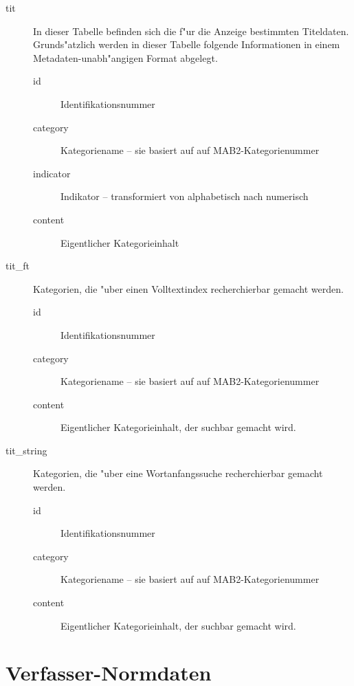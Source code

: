 \documentclass[11pt, twoside, a4paper, BCOR8mm, DIV12, bibtotoc,idxtotoc]{scrbook}
\begin{document}
\begin{description}
\item[tit] In dieser Tabelle befinden sich die f"ur die Anzeige
  bestimmten Titeldaten. Grunds"atzlich werden in dieser Tabelle
  folgende Informationen in einem Metadaten-unabh"angigen Format
  abgelegt.
  \begin{description}
  \item[id] Identifikationsnummer
  \item[category] Kategoriename -- sie basiert auf auf MAB2-Kategorienummer
  \item[indicator] Indikator -- transformiert von alphabetisch nach numerisch
  \item[content] Eigentlicher Kategorieinhalt
  \end{description}
\item[tit\_ft] Kategorien, die "uber einen Volltextindex recherchierbar
  gemacht werden.
  \begin{description}
  \item[id] Identifikationsnummer
  \item[category] Kategoriename -- sie basiert auf auf MAB2-Kategorienummer
  \item[content] Eigentlicher Kategorieinhalt, der suchbar gemacht wird.
  \end{description}
\item[tit\_string] Kategorien, die "uber eine Wortanfangssuche
  recherchierbar gemacht werden.
  \begin{description}
  \item[id] Identifikationsnummer
  \item[category] Kategoriename -- sie basiert auf auf MAB2-Kategorienummer
  \item[content] Eigentlicher Kategorieinhalt, der suchbar gemacht wird.
  \end{description}
\end{description}

\section{Verfasser-Normdaten}
\end{document}
